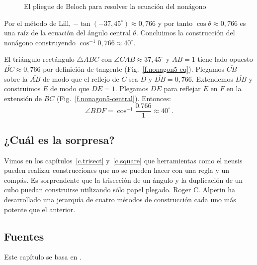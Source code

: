 \begin{figure}[t]
\begin{center}
\end{center}
\caption{El pliegue de Beloch para resolver la ecuación del nonágono}\label{f.nonagon3}
\end{figure}

Por el método de Lill, $-\tan (-37,45^\circ)\approx 0,766$ y por tanto $\cos \theta \approx 0,766$ es una raíz de la ecuación del ángulo central $\theta$. Concluimos la construcción del nonágono construyendo $\cos^{-1} 0,766\approx 40^\circ$.

El triángulo rectángulo $\triangle ABC$ con $\angle CAB\approx 37,45^\circ$ y $\overline{AB}=1$ tiene lado opuesto $\overline{BC}\approx 0,766$ por definición de tangente (Fig.~\ref{f.nonagon5-eq}).
Plegamos $\overline{CB}$ sobre la $\overline{AB}$ de modo que el reflejo de $C$ sea $D$ y $\overline{DB}=0,766$. Extendemos $\overline{DB}$ y construimos $E$ de modo que $\overline{DE}=1$.
Plegamos $\overline{DE}$ para reflejar $E$ en $F$ en la extensión de $\overline{BC}$ (Fig.~\ref{f.nonagon5-central}). Entonces:
\[
\angle BDF=\cos^{-1} \frac{0.766}{1}\approx 40^\circ\,.
\]
\subsection*{¿Cuál es la sorpresa?}

Vimos en los capítulos~\ref{c.trisect} y~\ref{c.square} que herramientas como el neusis pueden realizar construcciones que no se pueden hacer con una regla y un compás. Es sorprendente que la trisección de un ángulo y la duplicación de un cubo puedan construirse utilizando sólo papel plegado. Roger C. Alperin ha desarrollado una jerarquía de cuatro métodos de construcción cada uno más potente que el anterior.

\subsection*{Fuentes}

Este capítulo se basa en \cite{alperin,lang,martin,newton}.

